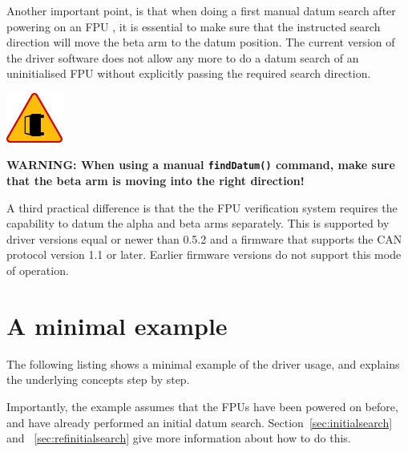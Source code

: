 \documentclass[11pt,a4paper]{scrartcl}
\newenvironment{warning}{\begin{framed}\includegraphics[width=5em]{accident-area-ahead.png}
}{\end{framed}}
\begin{document}
Another important point, is that when doing a first manual datum
search after powering on an FPU , it is essential to make sure that
the instructed search direction will move the beta arm to the datum
position. The current version of the driver software does not allow
any more to do a datum search of an uninitialised FPU without
explicitly passing the required search direction.

\begin{warning}
  \textbf{WARNING: When using a manual \texttt{findDatum()} command,
  make sure that the beta arm is moving into the right direction!}
\end{warning}


A third practical difference is that the the FPU verification system
requires the capability to datum the alpha and beta arms separately.
This is supported by driver versions equal or newer than 0.5.2 and a
firmware that supports the CAN protocol version 1.1 or later. Earlier
firmware versions do not support this mode of operation.



\section{A minimal example}
\label{sec:minimalexample}
The following listing shows a minimal example of the
driver usage, and explains the underlying concepts
step by step.

Importantly, the example assumes that the FPUs have been powered on
before, and have already performed an initial datum search.
Section~\ref{sec:initialsearch} and ~\ref{sec:refinitialsearch} give
more information about how to do this.
\end{document}
